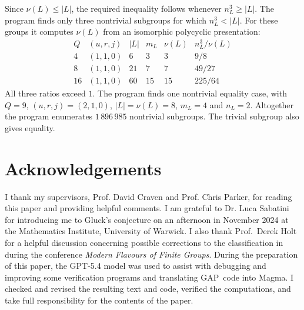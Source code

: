 \documentclass[10pt]{amsart}
\theoremstyle{definition}
\renewcommand{\leq}{\leqslant}
\renewcommand{\geq}{\geqslant}
\let\oldendproof\endproof
\renewenvironment{proof}[1][\proofname]{%
  \oldproof[\bfseries #1]%
}{\oldendproof}
\newcommand{\GAP}{\textsf{GAP}}
\newcommand{\Magma}{\textsf{Magma}}
\numberwithin{equation}{section}
\numberwithin{table}{section}
\begin{document}
\begin{proof}
Since $\nu(L)\leq|L|$, the required inequality follows whenever
$n_L^3\geq|L|$. The program finds only three nontrivial subgroups for
which $n_L^3<|L|$. For these groups it computes $\nu(L)$ from an
isomorphic polycyclic presentation:
$$
\begin{array}{c|c|c|c|c|c}
 Q&(u,r,j)&|L|&m_L&\nu(L)&n_L^3/\nu(L)\\\hline
 4 &(1,1,0)&6 &3 &3 &9/8\\
 8 &(1,1,0)&21&7 &7 &49/27\\
 16&(1,1,0)&60&15&15&225/64
\end{array}
$$
All three ratios exceed $1$. The program finds one nontrivial equality case,
with $Q=9$, $(u,r,j)=(2,1,0)$, $|L|=\nu(L)=8$, $m_L=4$ and $n_L=2$.
Altogether the program enumerates $1\,896\,985$ nontrivial subgroups. The
trivial subgroup also gives equality.\qedhere
\end{proof}

\section*{Acknowledgements}

I thank my supervisors, Prof. David Craven and Prof. Chris Parker, for reading this paper and providing helpful comments. I am grateful to
Dr. Luca Sabatini for introducing me to Gluck's conjecture on an afternoon in November 2024 at the Mathematics Institute, University of Warwick. I also thank Prof.~Derek Holt for a helpful discussion concerning possible corrections to the classification in~\cite{HY23} during the conference \emph{Modern Flavours of Finite Groups}. During the preparation of this paper, the GPT-5.4 model was used to assist with debugging and improving some verification programs and translating \GAP~code into \Magma. I checked and revised the resulting text and code, verified the computations, and take full responsibility for the contents of the paper.
\end{document}
